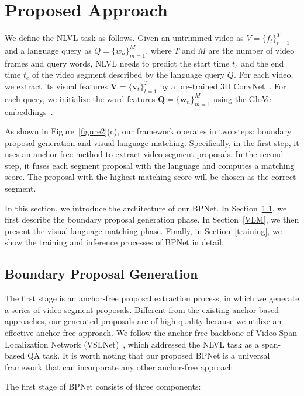 \documentclass[letterpaper]{article} %
\begin{document}
\section{Proposed Approach}
We define the NLVL task as follows. Given an untrimmed video as $V=\{f_t\}^T_{t=1}$ and a language query 
as $Q=\{w_n\}^M_{m=1}$, where $T$ and $M$ are the number of video frames and query words, NLVL needs to predict the 
start time $t_s$ and the end time $t_e$ of the video segment described by the language query $Q$.  
For each video, we extract its visual features $\bm{V} = \{\bm{v}_t\}^T_{t=1}$ by a pre-trained 3D ConvNet~\cite{DBLP:conf/iccv/TranBFTP15}. For each query, we initialize the word features $\bm{Q} = \{\bm{w}_n\}^M_{m=1}$ using the GloVe embeddings~\cite{DBLP:conf/emnlp/PenningtonSM14}. 

As shown in Figure~\ref{figure2}(c), our framework operates in two steps: boundary proposal generation and visual-language matching. Specifically, in the first step, it uses an anchor-free method to extract video segment proposals. In the second step, it fuses each segment proposal with the language and computes a matching score. The proposal with the highest matching score will be chosen as the correct segment. 

In this section, we introduce the architecture of our BPNet. In Section~\ref{BPG}, we first describe the boundary proposal generation phase. In Section~\ref{VLM}, we then present the visual-language matching phase. Finally, in Section~\ref{training}, we show the training and inference processes of BPNet in detail.

\subsection{Boundary Proposal Generation}\label{BPG}
The first stage is an anchor-free proposal extraction process, in which we generate a series of video segment proposals. Different from 
the existing anchor-based approaches, our generated proposals are of 
high quality because we utilize an effective anchor-free approach. 
We follow the anchor-free backbone of Video Span Localization Network (VSLNet)~\cite{DBLP:conf/acl/ZhangSJZ20}, which addressed the NLVL task as a span-based QA task. It is worth noting that our proposed BPNet is 
a universal framework that can incorporate any other anchor-free 
approach.

The first stage of BPNet consists of three components: 
\end{document}
